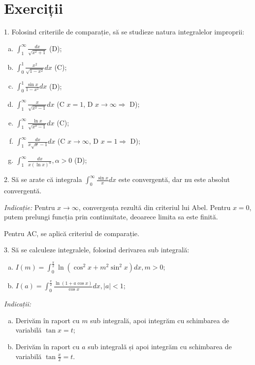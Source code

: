 \documentclass[11pt,a4paper]{article}
\newcommand\ds{\displaystyle}
\theoremstyle{dotless}
\theoremstyle{dotlessdr}
\begin{document}
\section{Exerciții}
\label{sec:exc}

1. Folosind criteriile de comparație, să se studieze natura integralelor improprii:
\begin{enumerate}[(a)]
\item $\ds\int_1^\infty \frac{dx}{\sqrt{x^2 + 1}}$ \hfill(D);
\item $\ds\int_0^1 \frac{x^2}{\sqrt{1 - x^2}} dx$ \hfill(C);
\item $\ds\int_0^1 \frac{\sin x}{1 - x^2} dx$ \hfill(D);
\item $\ds\int_1^\infty \frac{x}{\sqrt{x^3 - 1}} dx$ \hfill(C $x = 1$, D
  $x \to \infty \Rightarrow$ D);
\item $\ds\int_1^\infty \frac{\ln x}{\sqrt{x^3 - 1}} dx$ \hfill(C);
\item $\ds\int_1^\infty \frac{dx}{x \sqrt{x} - 1} dx$ \hfill(C $x \to \infty$,
  D $x = 1 \Rightarrow$ D);
\item $\ds\int_1^\infty \frac{dx}{x(\ln x)^\alpha}, \alpha > 0$ \hfill(D);
\end{enumerate}

\vspace{1cm}

2. Să se arate că integrala $\ds\int_0^\infty \frac{\sin x}{x} dx$ este convergentă,
dar nu este absolut convergentă.

\emph{Indicație:} Pentru $x \to \infty$, convergența rezultă din criteriul
lui Abel. Pentru $x = 0$, putem prelungi funcția prin continuitate, deoarece
limita sa este finită.

Pentru AC, se aplică criteriul de comparație.

\vspace{1cm}

3. Să se calculeze integralele, folosind derivarea sub integrală:
\begin{enumerate}[(a)]
\item $I(m) = \ds\int_0^{\frac{\pi}{2}} \ln(\cos^2 x + m^2 \sin^2 x) dx, m > 0$;
\item $I(a) = \ds\int_0^{\frac{\pi}{2}} \frac{\ln(1 + a \cos x)}{\cos x} dx, |a| < 1$;
\end{enumerate}

\emph{Indicații:}
\begin{enumerate}[(a)]
\item Derivăm în raport cu $m$ sub integrală, apoi integrăm cu schimbarea de variabilă
  $\tan x = t$;
\item Derivăm în raport cu $a$ sub integrală și apoi integrăm cu schimbarea de variabilă
  $\tan \frac{x}{2} = t$.
\end{enumerate}
\end{document}
